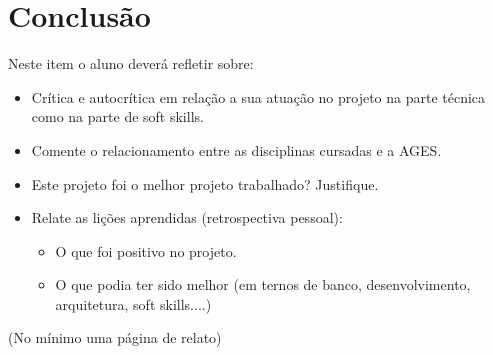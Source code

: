 \section[Conclusão]{Conclusão}

Neste item o aluno deverá refletir sobre:
\begin{itemize}
    \item Crítica e autocrítica em relação a sua atuação no projeto na parte técnica como na parte de soft skills.
    \item Comente o relacionamento entre as disciplinas cursadas e a AGES.
    \item Este projeto foi o melhor projeto trabalhado? Justifique.
    \item Relate as lições aprendidas (retrospectiva pessoal):
    \begin{itemize}
        \item O que foi positivo no projeto.
        \item O que podia ter sido melhor (em ternos de banco, desenvolvimento, arquitetura, soft skills....)
    \end{itemize}
\end{itemize}
(No mínimo uma página de relato)
